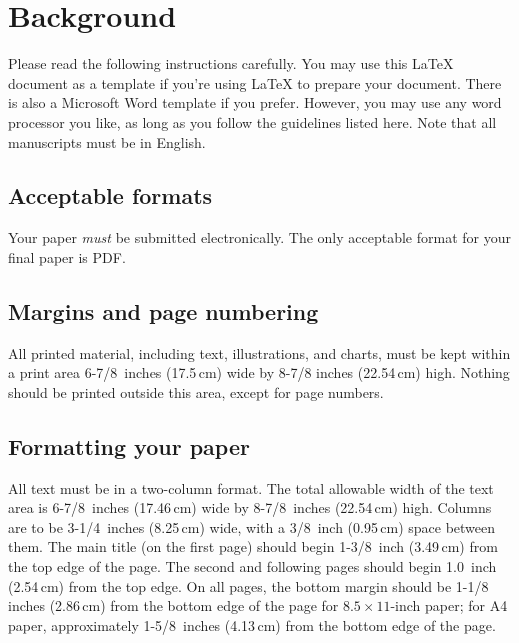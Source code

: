\documentclass[10pt,twocolumn]{article}
\newcommand{\latex}{\LaTeX\xspace}
\begin{document}
\section{Background}

Please read the following instructions carefully.  You may use this
\latex document as a template if you're using \latex to prepare your
document.  There is also a Microsoft Word template if you prefer.
However, you may use any word processor you like, as long as you
follow the guidelines listed here.  Note that all manuscripts must be
in English.

\subsection{Acceptable formats}

Your paper \emph{must} be submitted electronically.  The only acceptable
format for your final paper is PDF.

\subsection{Margins and page numbering}

All printed material, including text, illustrations, and charts, must
be kept within a print area 6-7/8~inches (17.5\,cm) wide by 8-7/8
inches (22.54\,cm) high.  Nothing should be printed outside this area,
except for page numbers.

\subsection{Formatting your paper}

All text must be in a two-column format. The total allowable width of
the text area is 6-7/8~inches (17.46\,cm) wide by 8-7/8~inches
(22.54\,cm) high. Columns are to be 3-1/4~inches (8.25\,cm) wide, with
a 3/8~inch (0.95\,cm) space between them. The main title (on the first
page) should begin 1-3/8~inch (3.49\,cm) from the top edge of the
page. The second and following pages should begin 1.0~inch (2.54\,cm)
from the top edge. On all pages, the bottom margin should be 1-1/8
inches (2.86\,cm) from the bottom edge of the page for $8.5 \times
11$-inch paper; for A4 paper, approximately 1-5/8~inches (4.13\,cm)
from the bottom edge of the page.
\end{document}
